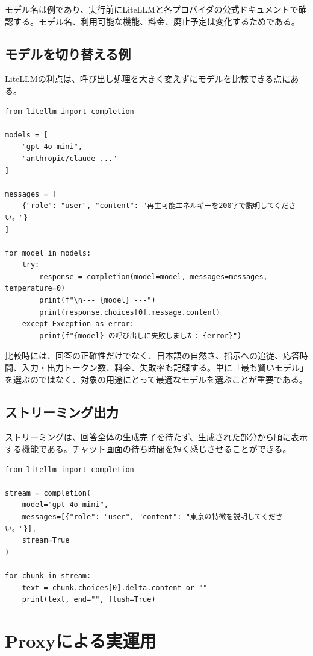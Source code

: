 \documentclass[a4paper,11pt]{jsarticle}
\begin{document}
モデル名は例であり、実行前にLiteLLMと各プロバイダの公式ドキュメントで確認する。モデル名、利用可能な機能、料金、廃止予定は変化するためである。

\subsection{モデルを切り替える例}

LiteLLMの利点は、呼び出し処理を大きく変えずにモデルを比較できる点にある。

\begin{lstlisting}[caption={同じ質問を複数モデルで比較する例}]
from litellm import completion

models = [
    "gpt-4o-mini",
    "anthropic/claude-..."
]

messages = [
    {"role": "user", "content": "再生可能エネルギーを200字で説明してください。"}
]

for model in models:
    try:
        response = completion(model=model, messages=messages, temperature=0)
        print(f"\n--- {model} ---")
        print(response.choices[0].message.content)
    except Exception as error:
        print(f"{model} の呼び出しに失敗しました: {error}")
\end{lstlisting}

比較時には、回答の正確性だけでなく、日本語の自然さ、指示への追従、応答時間、入力・出力トークン数、料金、失敗率も記録する。単に「最も賢いモデル」を選ぶのではなく、対象の用途にとって最適なモデルを選ぶことが重要である。

\subsection{ストリーミング出力}

ストリーミングは、回答全体の生成完了を待たず、生成された部分から順に表示する機能である。チャット画面の待ち時間を短く感じさせることができる。

\begin{lstlisting}[caption={ストリーミング出力の例}]
from litellm import completion

stream = completion(
    model="gpt-4o-mini",
    messages=[{"role": "user", "content": "東京の特徴を説明してください。"}],
    stream=True
)

for chunk in stream:
    text = chunk.choices[0].delta.content or ""
    print(text, end="", flush=True)
\end{lstlisting}

\section{Proxyによる実運用}
\end{document}
